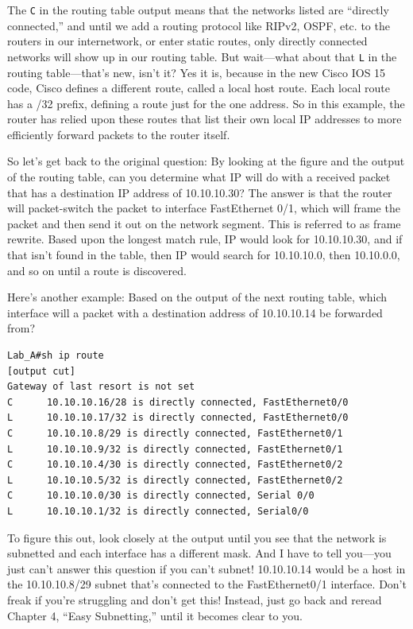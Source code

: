 The \texttt{C} in the routing table output means that the networks
listed are ``directly connected,'' and until we add a routing protocol
like RIPv2, OSPF, etc. to the routers in our internetwork, or enter
static routes, only directly connected networks will show up in our
routing table. But wait---what about that \texttt{L} in the routing
table---that's new, isn't it? Yes it is, because in the new Cisco IOS 15
code, Cisco defines a different route, called a local host route. Each
local route has a /32 prefix, defining a route just for the one address.
So in this example, the router has relied upon these routes that list
their own local IP addresses to more efficiently forward packets to the
router itself.

\protect\hypertarget{c09.xhtmlux5cux23Page_361}{}{}So let's get back to
the original question: By looking at the figure and the output of the
routing table, can you determine what IP will do with a received packet
that has a destination IP address of 10.10.10.30? The answer is that the
router will packet-switch the packet to interface FastEthernet 0/1,
which will frame the packet and then send it out on the network segment.
This is referred to as frame rewrite. Based upon the longest match rule,
IP would look for 10.10.10.30, and if that isn't found in the table,
then IP would search for 10.10.10.0, then 10.10.0.0, and so on until a
route is discovered.

Here's another example: Based on the output of the next routing table,
which interface will a packet with a destination address of 10.10.10.14
be forwarded from?

\begin{verbatim}
Lab_A#sh ip route
[output cut]
Gateway of last resort is not set
C      10.10.10.16/28 is directly connected, FastEthernet0/0
L      10.10.10.17/32 is directly connected, FastEthernet0/0
C      10.10.10.8/29 is directly connected, FastEthernet0/1
L      10.10.10.9/32 is directly connected, FastEthernet0/1
C      10.10.10.4/30 is directly connected, FastEthernet0/2
L      10.10.10.5/32 is directly connected, FastEthernet0/2
C      10.10.10.0/30 is directly connected, Serial 0/0
L      10.10.10.1/32 is directly connected, Serial0/0
\end{verbatim}

To figure this out, look closely at the output until you see that the
network is subnetted and each interface has a different mask. And I have
to tell you---you just can't answer this question if you can't subnet!
10.10.10.14 would be a host in the 10.10.10.8/29 subnet that's connected
to the FastEthernet0/1 interface. Don't freak if you're struggling and
don't get this! Instead, just go back and reread Chapter 4, ``Easy
Subnetting,'' until it becomes clear to you.


